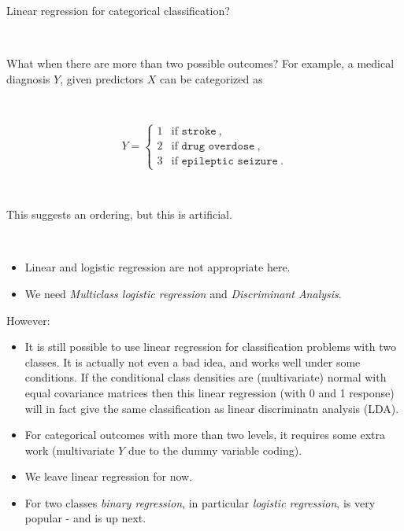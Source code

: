 \documentclass[10pt,ignorenonframetext,]{beamer}
\providecommand{\tightlist}{%
  \setlength{\itemsep}{0pt}\setlength{\parskip}{0pt}}
\begin{document}
\begin{frame}

\begin{block}{Linear regression for categorical classification?}

\(~\)

What when there are more than two possible outcomes? For example, a
medical diagnosis \(Y\), given predictors \(X\) can be categorized as

\(~\)

\[Y = \left\{ \begin{array}{ll}
1 & \text{if } \texttt{stroke} \ , \\
2 & \text{if } \texttt{drug overdose} \ , \\
3 & \text{if } \texttt{epileptic seizure} \ .
\end{array} \right.\]

\(~\)

This suggests an ordering, but this is artificial.

\(~\)

\begin{itemize}
\tightlist
\item
  Linear and logistic regression are not appropriate here.
\item
  We need \emph{Multiclass logistic regression} and \emph{Discriminant
  Analysis}.
\end{itemize}

\end{block}

\end{frame}

\begin{frame}

\begin{block}{However:}

\begin{itemize}
\item
  It is still possible to use linear regression for classification
  problems with two classes. It is actually not even a bad idea, and
  works well under some conditions. If the conditional class densities
  are (multivariate) normal with equal covariance matrices then this
  linear regression (with 0 and 1 response) will in fact give the same
  classification as linear discriminatn analysis (LDA).
\item
  For categorical outcomes with more than two levels, it requires some
  extra work (multivariate \(Y\) due to the dummy variable coding).
\item
  We leave linear regression for now.
\item
  For two classes \emph{binary regression}, in particular \emph{logistic
  regression}, is very popular - and is up next.
\end{itemize}

\end{block}

\end{frame}
\end{document}
